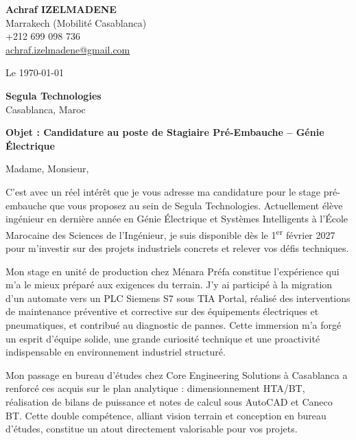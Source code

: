 \documentclass[11pt,a4paper]{article}
\begin{document}
\begin{flushleft}
\textbf{\Large Achraf IZELMADENE}\\
Marrakech (Mobilité Casablanca)\\
+212 699 098 736\\
\href{mailto:achraf.izelmadene@gmail.com}{achraf.izelmadene@gmail.com}
\end{flushleft}

\vspace{0.5cm}

\begin{flushright}
Le \today
\end{flushright}

\vspace{0.3cm}

\begin{flushright}
\textbf{Segula Technologies}\\
Casablanca, Maroc
\end{flushright}

\vspace{0.5cm}

\textbf{Objet : Candidature au poste de Stagiaire Pré-Embauche -- Génie Électrique}

\vspace{0.5cm}

Madame, Monsieur,

C'est avec un réel intérêt que je vous adresse ma candidature pour le stage pré-embauche que vous proposez au sein de Segula Technologies. Actuellement élève ingénieur en dernière année en Génie Électrique et Systèmes Intelligents à l'École Marocaine des Sciences de l'Ingénieur, je suis disponible dès le 1\textsuperscript{er} février 2027 pour m'investir sur des projets industriels concrets et relever vos défis techniques.

Mon stage en unité de production chez Ménara Préfa constitue l'expérience qui m'a le mieux préparé aux exigences du terrain. J'y ai participé à la migration d'un automate vers un PLC Siemens S7 sous TIA Portal, réalisé des interventions de maintenance préventive et corrective sur des équipements électriques et pneumatiques, et contribué au diagnostic de pannes. Cette immersion m'a forgé un esprit d'équipe solide, une grande curiosité technique et une proactivité indispensable en environnement industriel structuré.

Mon passage en bureau d'études chez Core Engineering Solutions à Casablanca a renforcé ces acquis sur le plan analytique : dimensionnement HTA/BT, réalisation de bilans de puissance et notes de calcul sous AutoCAD et Caneco BT. Cette double compétence, alliant vision terrain et conception en bureau d'études, constitue un atout directement valorisable pour vos projets.
\end{document}
